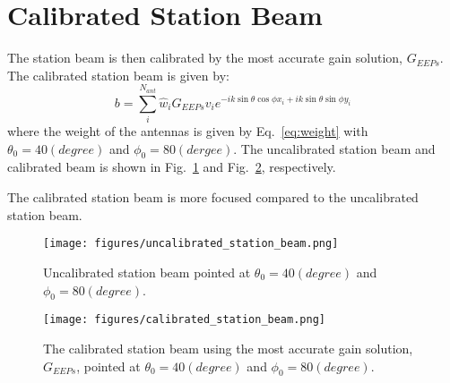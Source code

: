 \documentclass[10pt,a4paper,twocolumn]{paper}
\begin{document}
\section{Calibrated Station Beam}
The station beam is then calibrated by the most accurate gain solution, $G_{EEPs}$. The calibrated station beam is given by:
\begin{equation}
    b = \sum_{i}^{N_{ant}} \hat{w}_i G_{EEPs} v_i e^{-ik\sin\theta\cos\phi x_i + ik\sin\theta\sin\phi y_i}
    \label{eq:station_beam}
\end{equation}
where the weight of the antennas is given by Eq.~\ref{eq:weight} with $\theta_0 = 40(degree)$ and $\phi_0 = 80(dergee)$. The uncalibrated station beam and calibrated beam is shown in Fig.~\ref{fig:uncalibrated_station_beam} and Fig.~\ref{fig:calibrated_station_beam}, respectively.

The calibrated station beam is more focused compared to the uncalibrated station beam. 

\begin{figure}[H]
    \centering
    \texttt{[image: figures/uncalibrated\_station\_beam.png]}
    \caption{Uncalibrated station beam pointed at $\theta_0 = 40(degree)$ and $\phi_0 = 80(degree)$.}
    \label{fig:uncalibrated_station_beam}
\end{figure}

\begin{figure}[H]
    \centering
    \texttt{[image: figures/calibrated\_station\_beam.png]}
    \caption{The calibrated station beam using the most accurate gain solution, $G_{EEPs}$, pointed at $\theta_0 = 40(degree)$ and $\phi_0 = 80(degree).$}
    \label{fig:calibrated_station_beam}
\end{figure}
\end{document}
